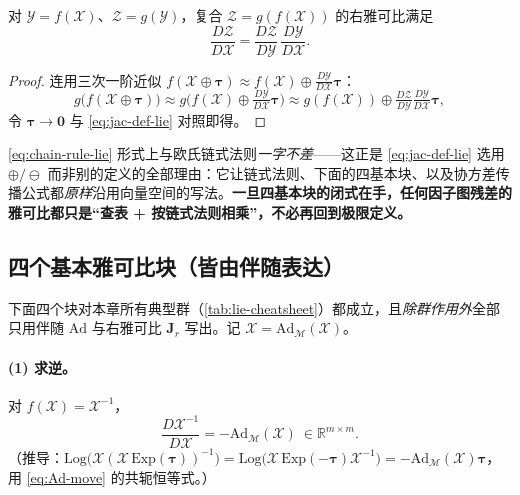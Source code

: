\begin{theorem}[链式法则]\label{thm:chain-rule-lie}
对 $\mathcal{Y}=f(\mathcal{X})$、$\mathcal{Z}=g(\mathcal{Y})$，复合 $\mathcal{Z}=g(f(\mathcal{X}))$ 的右雅可比满足
\begin{equation}
  \frac{D\mathcal{Z}}{D\mathcal{X}}=\frac{D\mathcal{Z}}{D\mathcal{Y}}\,\frac{D\mathcal{Y}}{D\mathcal{X}}.
  \label{eq:chain-rule-lie}
\end{equation}
\end{theorem}
\begin{proof}
连用三次一阶近似 $f(\mathcal{X}\oplus\boldsymbol{\tau})\approx f(\mathcal{X})\oplus\frac{D\mathcal{Y}}{D\mathcal{X}}\boldsymbol{\tau}$：
\[
  g\big(f(\mathcal{X}\oplus\boldsymbol{\tau})\big)
  \approx g\Big(f(\mathcal{X})\oplus\tfrac{D\mathcal{Y}}{D\mathcal{X}}\boldsymbol{\tau}\Big)
  \approx g(f(\mathcal{X}))\oplus\tfrac{D\mathcal{Z}}{D\mathcal{Y}}\tfrac{D\mathcal{Y}}{D\mathcal{X}}\boldsymbol{\tau},
\]
令 $\boldsymbol{\tau}\to\mathbf{0}$ 与 \cref{eq:jac-def-lie} 对照即得。\cite{sola2018micro}
\end{proof}

\begin{insight}
\cref{eq:chain-rule-lie} 形式上与欧氏链式法则\emph{一字不差}——这正是 \cref{eq:jac-def-lie} 选用 $\oplus/\ominus$ 而非别的定义的全部理由：它让链式法则、下面的四基本块、以及协方差传播公式都\emph{原样}沿用向量空间的写法。\textbf{一旦四基本块的闭式在手，任何因子图残差的雅可比都只是“查表 + 按链式法则相乘”，不必再回到极限定义。}
\end{insight}

\subsection{四个基本雅可比块（皆由伴随表达）}
\label{subsec:lie-four-blocks}

下面四个块对本章所有典型群（\cref{tab:lie-cheatsheet}）都成立，且\emph{除群作用外}全部只用伴随 $\mathrm{Ad}$ 与右雅可比 $\mathbf{J}_r$ 写出\cite{sola2018micro}。记 $\boldsymbol{\mathcal{X}}=\mathrm{Ad}_{\mathcal{M}}(\mathcal{X})$。

\paragraph{(1) 求逆。}对 $f(\mathcal{X})=\mathcal{X}^{-1}$，
\begin{equation}
  \frac{D\mathcal{X}^{-1}}{D\mathcal{X}}=-\mathrm{Ad}_{\mathcal{M}}(\mathcal{X})\ \in\mathbb{R}^{m\times m}.
  \label{eq:jac-inv-block}
\end{equation}
（推导：$\mathrm{Log}\big(\mathcal{X}(\mathcal{X}\,\mathrm{Exp}(\boldsymbol{\tau}))^{-1}\big)=\mathrm{Log}\big(\mathcal{X}\,\mathrm{Exp}(-\boldsymbol{\tau})\mathcal{X}^{-1}\big)=-\mathrm{Ad}_{\mathcal{M}}(\mathcal{X})\boldsymbol{\tau}$，用 \cref{eq:Ad-move} 的共轭恒等式。）

